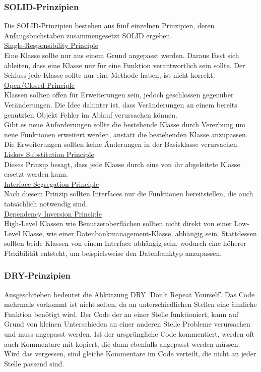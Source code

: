 \documentclass[12pt,a4paper]{article}
\begin{document}
\subsubsection{SOLID-Prinzipien}
Die SOLID-Prinzipien bestehen aus fünf einzelnen Prinzipien, deren Anfangsbuchstaben zusammengesetzt SOLID ergeben\cite{sarcar2021use}.\\
\underline{Single-Responsibility Principle}\\
Eine Klasse sollte nur aus einem Grund angepasst werden. Daraus lässt sich ableiten, dass eine Klasse nur für eine Funktion verantwortlich sein sollte. Der Schluss jede Klasse sollte nur eine Methode haben, ist nicht korrekt\cite{sarcar2021use}.\\
\underline{Open/Closed Principle}\\
Klassen sollten offen für Erweiterungen sein, jedoch geschlossen gegenüber Veränderungen. Die Idee dahinter ist, dass Veränderungen an einem bereits genutzten Objekt Fehler im Ablauf verursachen können. \\Gibt es neue Anforderungen sollte die bestehende Klasse durch Vererbung um neue Funktionen erweitert werden, anstatt die bestehenden Klasse anzupassen. Die Erweiterungen sollten keine Änderungen in der Basisklasse verursachen\cite{sarcar2021use}. \\
\underline{Liskov Substitution Principle}\\
Dieses Prinzip besagt, dass jede Klasse durch eine von ihr abgeleitete Klasse ersetzt werden kann\cite{sarcar2021use}.\\
\underline{Interface Segregation Principle}\\
Nach diesem Prinzip sollten Interfaces nur die Funktionen bereitstellen, die auch tatsächlich notwendig sind\cite{sarcar2021use}.\\
\underline{Dependency Inversion Principle}\\
High-Level Klassen wie Benutzeroberflächen sollten nicht direkt von einer Low-Level Klasse, wie einer Datenbankmanagement-Klasse, abhängig sein. Stattdessen sollten beide Klassen von einem Interface abhängig sein, wodurch eine höherer Flexibilität entsteht, um beispielsweise den Datenbanktyp anzupassen\cite{sarcar2021use}.
\subsubsection{DRY-Prinzipien}
Ausgeschrieben bedeutet die Abkürzung DRY \lq Don't Repeat Yourself\rq . Das Code mehrmals vorkommt ist nicht selten, da an unterschiedlichen Stellen eine ähnliche Funktion benötigt wird. Der Code der an einer Stelle funktioniert, kann auf Grund von kleinen Unterschieden an einer anderen Stelle Probleme verursachen und muss angepasst werden. Ist der ursprüngliche Code kommentiert, werden oft auch Kommentare mit kopiert, die dann ebenfalls angepasst werden müssen. Wird das vergessen, sind gleiche Kommentare im Code verteilt, die nicht an jeder Stelle passend sind\cite{sarcar2021use}.\\
\end{document}
